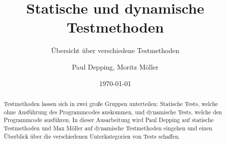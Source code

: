 \documentclass[	%
		fontsize=11pt,  %
		a4paper,	    %
		german,		%
		sans,			%
		f4,				%
	]{HsH-report}		%
\author{
	Paul Depping,
	Moritz Möller
} %
\title{Statische und dynamische Testmethoden}
\subtitle{Übersicht über verschiedene Testmethoden}
\date{\today}
\begin{document}

\frontmatter

\maketitle[c]

\declarationAuthorship

\begin{abstract}
	Testmethoden lassen sich in zwei große Gruppen unterteilen:
	Statische Tests, welche ohne Ausführung des Programmcodes auskommen, und dynamische Tests, welche den Programmcode ausführen.
	In dieser Ausarbeitung wird Paul Depping auf statische Testmethoden und Max Möller auf dynamische Testmethoden eingehen
	und einen Überblick über die verschiedenen Unterkategorien von Tests schaffen.
\end{abstract}

\tableofcontents

\mainmatter
\end{document}
